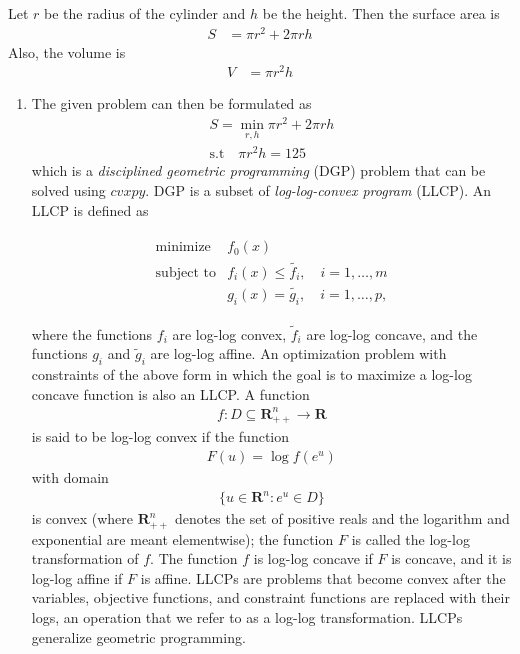 \documentclass[journal,12pt,twocolumn]{IEEEtran}
\renewcommand\thesection{\arabic{section}}
\begin{document}
\begin{enumerate}[label=\thesection.\arabic*.,ref=\thesection.\theenumi]
\solution Let $r$ be the radius of the cylinder and $h$ be the height.  Then the surface area is 
		\begin{align}
			\label{eq:opt-box-S}
			S &= \pi r^2 + 2\pi r h 
		\end{align}
		Also, the volume is 
		\begin{align}
			\label{eq:opt-box-V}
			V &= \pi r^2 h 
		\end{align}
		\begin{enumerate}
			\item 
		The given problem can then be formulated as 
		\begin{align}
			S = \min_{r,h}\pi r^2 + 2\pi r h 
			\\
			\text{s.t} \quad \pi r^2 h =125 
		\end{align}
				which is a {\em disciplined geometric programming} (DGP) problem that can be solved using $cvxpy$. DGP is a subset of 
				 {\em log-log-convex program} (LLCP). An LLCP is defined as

				\begin{equation}
\begin{split}
\begin{array}{ll}
\mbox{minimize} & f_0(x) \\
\mbox{subject to} & f_i(x) \leq \tilde{f_i}, \quad i=1, \ldots, m\\
& g_i(x) = \tilde{g_i}, \quad i=1, \ldots, p,
\end{array}
\end{split}
\end{equation}

where the functions $f_i$
				are log-log convex, $\tilde{f}_i$
 are log-log concave, and the functions $g_i$
				and $\tilde{g}_i$
 are log-log affine. An optimization problem with constraints of the above form in which the goal is to maximize a log-log concave function is also an LLCP.
A function 
				\begin{align}
 f : D \subseteq \mathbf{R}^{n}_{++} \to \mathbf{R}
				\end{align}
				is said to be log-log convex if the function
				\begin{align}
				F(u)=\log f(e^u)
				\end{align}
				with domain
				\begin{align}
				\{u \in \mathbf{R}^n : e^u \in D\}
				\end{align}
				is convex (where
$				\mathbf{R}^{n}_{++}$
				denotes the set of positive reals and the logarithm and exponential are meant elementwise); the function $F$  is called the log-log transformation of $f$. The function $f$ is log-log concave if $F$ is concave, and it is log-log affine if $F$ is affine.
				LLCPs are problems that become convex after the variables, objective functions, and constraint functions are replaced with their logs, an operation that we refer to as a log-log transformation. LLCPs generalize geometric programming.


\end{enumerate}
\end{enumerate}
\end{document}
